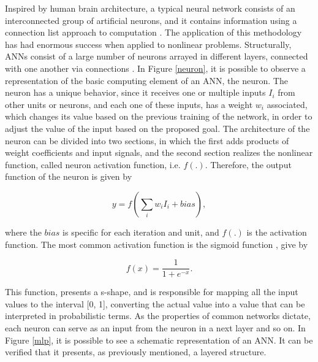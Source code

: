 Inspired by human brain architecture, a typical neural network consists of an interconnected group of artificial neurons, and it contains information using a connection list approach to computation \cite{ann1}. The application of this methodology has had enormous success when applied to nonlinear problems. Structurally, \ac{ANNs} consist of a large number of neurons arrayed in different layers, connected with one another via connections \cite{review2017}. In Figure \ref{neuron}, it is possible to observe a representation of the basic computing element of an \acs{ANN}, the neuron. 
The neuron has a unique behavior, since it receives one or multiple inputs $I_i$ from other units or neurons, and each one of these inputs, has a weight $w_i$ associated, which changes its value based on the previous training of the network, in order to adjust the value of the input based on the proposed goal. The architecture of the neuron can be divided into two sections, in which the first adds products of weight coefficients and input signals, and the second section realizes the nonlinear function, called neuron activation function, i.e. $f(.)$. Therefore, the output function of the neuron is given by \cite{ann1}

\begin{equation}
   y = f(\sum_i w_i I_i + bias), 
   \label{tauequation}
\end{equation}

where the $bias$ is specific for each iteration and unit, and $f(.)$ is the activation function. The most common activation function is the sigmoid function \cite{ann1}, give by

\begin{equation}
   f(x) = \frac{1}{1+e^{-x}}.
   \label{fequation}
\end{equation}

This function, presents a s-shape, and is responsible for mapping all the input values to the interval [0, 1], converting the actual value into a value that can be interpreted in probabilistic terms. As the properties of common networks dictate, each neuron can serve as an input from the neuron in a next layer and so on. In Figure \ref{mlp}, it is possible to see a schematic representation of an \acs{ANN}. It can be verified that it presents, as previously mentioned, a layered structure. 


